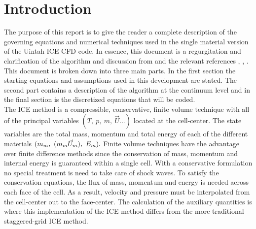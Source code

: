 \documentclass[fleqn]{article}
\begin{document}
\section{\textsf{Introduction}}
\label{sec-overview}
The purpose of this report is to give the reader a complete description
of the governing equations and numerical techniques used in the single
material version of the Uintah ICE CFD code.  In essence, this document
is a regurgitation and clarification of the algorithm and discussion
from  and the relevant references ,
, .  This document is broken
down into three main parts.  In the first section the starting equations and
assumptions used in this development are stated.  The second part contains a
description of the algorithm at the continuum level and in the final section
is the discretized equations that will be coded.\\

The ICE method is a compressible, conservative, finite volume technique
with all of the principal variables $(T,~p,~m,~ \vec{U} ...)$ located at
the cell-center.  The state variables are the total mass, momentum and
total energy of each of the different materials $(m_m, ~(m_m\um),~E_m ).$
Finite volume techniques have the advantage over finite difference methods
since the conservation of mass, momentum and internal energy is guaranteed
within a single cell.  With a conservative formulation no special treatment
is need to take care of shock waves.  To satisfy the conservation equations,
the flux of mass, momentum and energy is needed across each face of the cell.
As a result, velocity and pressure must be interpolated from the cell-center
out to the face-center.  The calculation of the auxiliary quantities is
where this implementation of the ICE method differs from the more traditional
staggered-grid ICE method.\\
%
%
\newpage
\end{document}
